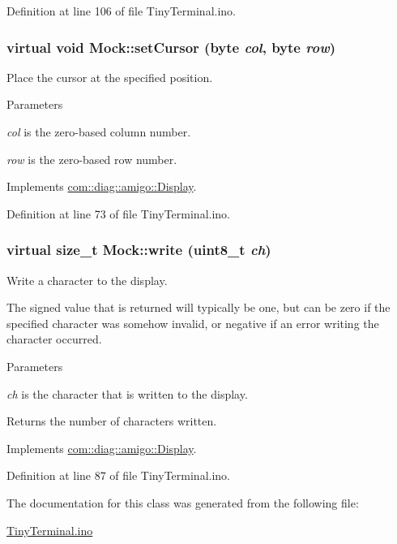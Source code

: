 Definition at line 106 of file TinyTerminal.ino.

\hypertarget{classMock_a5545e824f824b147221b61355cabbd5b}{
\subsubsection[{setCursor}]{\setlength{\rightskip}{0pt plus 5cm}virtual void Mock::setCursor (byte {\em col}, \/  byte {\em row})}}
\label{classMock_a5545e824f824b147221b61355cabbd5b}


Place the cursor at the specified position. 


\begin{DoxyParams}{Parameters}
\item[{\em col}]is the zero-\/based column number. \item[{\em row}]is the zero-\/based row number. \end{DoxyParams}


Implements \hyperlink{structcom_1_1diag_1_1amigo_1_1Display_ab5356a375bc24de2be5ce1b05bd9fd56}{com::diag::amigo::Display}.



Definition at line 73 of file TinyTerminal.ino.

\hypertarget{classMock_ac3d7b857783204d996cd3e0a147a4ac5}{
\subsubsection[{write}]{\setlength{\rightskip}{0pt plus 5cm}virtual size\_\-t Mock::write (uint8\_\-t {\em ch})}}
\label{classMock_ac3d7b857783204d996cd3e0a147a4ac5}


Write a character to the display. 

The signed value that is returned will typically be one, but can be zero if the specified character was somehow invalid, or negative if an error writing the character occurred. 
\begin{DoxyParams}{Parameters}
\item[{\em ch}]is the character that is written to the display. \end{DoxyParams}
\begin{DoxyReturn}{Returns}
the number of characters written. 
\end{DoxyReturn}


Implements \hyperlink{structcom_1_1diag_1_1amigo_1_1Display_a4fa3864436e551a42135fbbd3bcb1a3f}{com::diag::amigo::Display}.



Definition at line 87 of file TinyTerminal.ino.



The documentation for this class was generated from the following file:\begin{DoxyCompactItemize}
\item 
\hyperlink{TinyTerminal_8ino}{TinyTerminal.ino}\end{DoxyCompactItemize}
